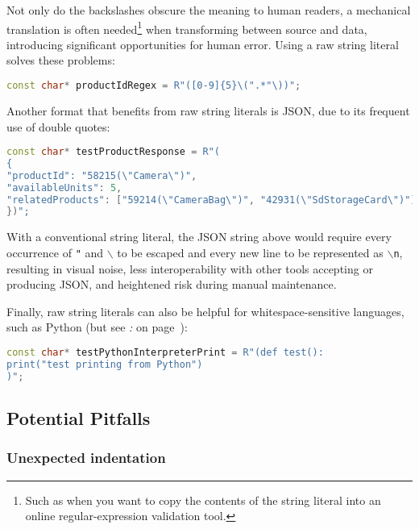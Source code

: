 \noindent Not only do the backslashes obscure the meaning to human readers, a
mechanical translation is often needed{\cprotect\footnote{Such as when
you want to copy the contents of the string literal into an online
regular-expression validation tool.}} when transforming between source
and data, introducing significant opportunities for human error. Using a
raw string literal solves these problems:

\begin{lstlisting}[language=C++]
const char* productIdRegex = R"([0-9]{5}\(".*"\))";
\end{lstlisting}

\noindent Another format that benefits from raw string literals is JSON, due to
its frequent use of double quotes:

\begin{lstlisting}[language=C++]
const char* testProductResponse = R"(
{
"productId": "58215(\"Camera\")",
"availableUnits": 5,
"relatedProducts": ["59214(\"CameraBag\")", "42931(\"SdStorageCard\")"]
})";
\end{lstlisting}

\noindent With a conventional string literal, the JSON string above would require
every occurrence of \texttt{"} and \texttt{$\backslash$} to be escaped
and every new line to be represented as \texttt{$\backslash$n}, resulting
in visual noise, less interoperability with other tools accepting or
producing JSON, and heightened risk during manual maintenance.

Finally, raw string literals can also be helpful for
whitespace-sensitive languages, such as Python (but see \textit{: } on page~\pageref{encoding-of-newlines-and-whitespace}):

\begin{lstlisting}[language=C++]
const char* testPythonInterpreterPrint = R"(def test():
print("test printing from Python")
)";
\end{lstlisting}


\subsection[Potential Pitfalls]{Potential Pitfalls}\label{potential-pitfalls-rawstringliteral}

\subsubsection[Unexpected indentation]{Unexpected indentation}\label{unexpected-indentation}


